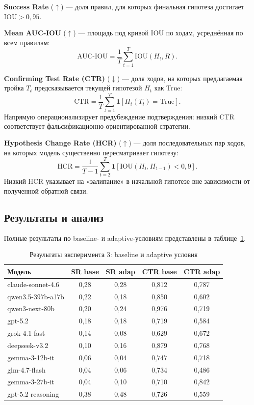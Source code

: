 \textbf{Success Rate} ($\uparrow$) --- доля правил, для которых финальная гипотеза достигает $\text{IOU} > 0{,}95$.

\textbf{Mean AUC-IOU} ($\uparrow$) --- площадь под кривой IOU по ходам, усреднённая по всем правилам:
\begin{equation}
  \text{AUC-IOU} = \frac{1}{T} \sum_{t=1}^{T} \text{IOU}(H_t, R).
  \label{eq:auc_iou}
\end{equation}

\textbf{Confirming Test Rate (CTR)} ($\downarrow$) --- доля ходов, на которых предлагаемая тройка $T_t$ предсказывается текущей гипотезой $H_t$ как True:
\begin{equation}
  \text{CTR} = \frac{1}{T} \sum_{t=1}^{T} \mathbf{1}[H_t(T_t) = \text{True}].
  \label{eq:ctr}
\end{equation}
Напрямую операционализирует предубеждение подтверждения: низкий CTR соответствует фальсификационно-ориентированной стратегии.

\textbf{Hypothesis Change Rate (HCR)} ($\uparrow$) --- доля последовательных пар ходов, на которых модель существенно пересматривает гипотезу:
\begin{equation}
  \text{HCR} = \frac{1}{T-1} \sum_{t=2}^{T} \mathbf{1}[\text{IOU}(H_t, H_{t-1}) < 0{,}9].
  \label{eq:hcr}
\end{equation}
Низкий HCR указывает на «залипание» в начальной гипотезе вне зависимости от полученной обратной связи.

\subsection{Результаты и анализ}

Полные результаты по baseline- и adaptive-условиям представлены в таблице~\ref{tab:246_results}.

\begin{table}[h!]
\caption{Результаты эксперимента 3: baseline и adaptive условия}
\label{tab:246_results}
\centering
\begin{tabular}{|l|c|c|c|c|}
\hline
\textbf{Модель} & \textbf{SR base} & \textbf{SR adap} & \textbf{CTR base} & \textbf{CTR adap} \\
\hline
claude-sonnet-4.6  & 0,28 & 0,28 & 0,812 & 0,787 \\
qwen3.5-397b-a17b  & 0,22 & 0,18 & 0,850 & 0,602 \\
qwen3-next-80b     & 0,20 & 0,24 & 0,976 & 0,719 \\
gpt-5.2            & 0,18 & 0,18 & 0,719 & 0,584 \\
grok-4.1-fast      & 0,14 & 0,08 & 0,629 & 0,672 \\
deepseek-v3.2      & 0,10 & 0,16 & 0,879 & 0,768 \\
gemma-3-12b-it     & 0,06 & 0,04 & 0,747 & 0,718 \\
glm-4.7-flash      & 0,04 & 0,06 & 0,734 & 0,486 \\
gemma-3-27b-it     & 0,04 & 0,10 & 0,710 & 0,842 \\
\hline
gpt-5.2 reasoning  & 0,38 & 0,48 & 0,726 & 0,559 \\
\hline
\end{tabular}
\end{table}

